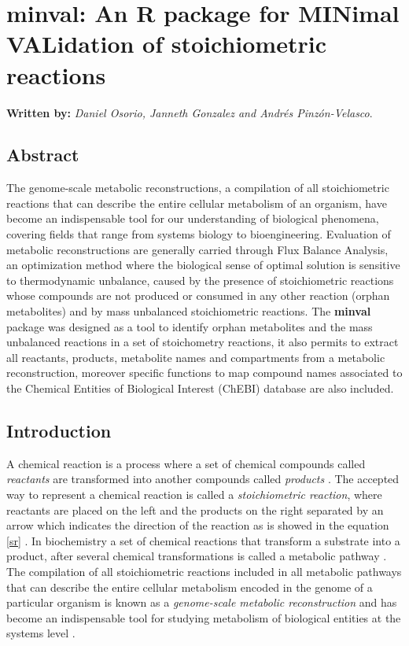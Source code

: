 \chapter{minval: An R package for MINimal VALidation of stoichiometric reactions}
\textbf{Written by:} \textit{Daniel Osorio, Janneth Gonzalez and Andrés Pinzón-Velasco}.\\
\section{Abstract}
The genome-scale metabolic reconstructions, a compilation of all stoichiometric reactions that can describe the entire cellular metabolism of an organism, have become an indispensable tool for our understanding of biological phenomena, covering fields that range from systems biology to bioengineering. Evaluation of metabolic reconstructions are generally carried through Flux Balance Analysis, an optimization method where the biological sense of optimal solution is sensitive to thermodynamic unbalance, caused by the presence of stoichiometric reactions whose compounds are not produced or consumed in any other reaction (orphan metabolites) and by mass unbalanced stoichiometric reactions.  The \textbf{minval} package was designed as a tool to identify orphan metabolites and the mass unbalanced reactions in a set of stoichometry reactions, it also permits to extract all reactants, products, metabolite names and compartments from a metabolic reconstruction, moreover specific functions to map compound names associated to the Chemical Entities of Biological Interest (ChEBI) database are also included.
\section{Introduction}
A chemical reaction is a process where a set of chemical compounds called \emph{reactants} are transformed into another compounds called \emph{products} \cite{Chen2013}. The accepted way to represent a chemical reaction is called a \emph{stoichiometric reaction}, where reactants are placed on the left and the products on the right separated by an arrow which indicates the direction of the reaction as is showed in the equation \ref{sr} \cite{Hendrickson1997}. In biochemistry a set of chemical reactions that transform a substrate into a product, after several chemical transformations is called a metabolic pathway \cite{Lambert2011}. The compilation of all stoichiometric reactions included in all metabolic pathways that can describe the entire cellular metabolism encoded in the genome of a particular organism is known as a \emph{genome-scale metabolic reconstruction} \cite{Park2009} and has become an indispensable tool for studying metabolism of biological entities at the systems level \cite{Thiele2010}.

